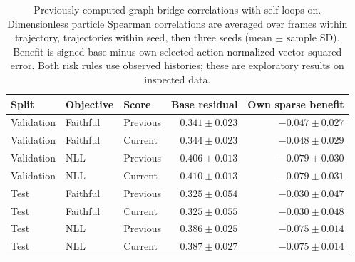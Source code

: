 \begin{table}[ht]
\centering\small
\caption{Previously computed graph-bridge correlations with self-loops on. Dimensionless particle Spearman correlations are averaged over frames within trajectory, trajectories within seed, then three seeds (mean $\pm$ sample SD). Benefit is signed base-minus-own-selected-action normalized vector squared error. Both risk rules use observed histories; these are exploratory results on inspected data.}
\label{tab:graph-bridge-risk-benefit}
\begin{tabular}{lllrr}
\toprule
Split & Objective & Score & Base residual & Own sparse benefit\\
\midrule
Validation&Faithful&Previous&$0.341\pm0.023$&$-0.047\pm0.027$\\
Validation&Faithful&Current&$0.344\pm0.023$&$-0.048\pm0.029$\\
Validation&NLL&Previous&$0.406\pm0.013$&$-0.079\pm0.030$\\
Validation&NLL&Current&$0.410\pm0.013$&$-0.079\pm0.031$\\
Test&Faithful&Previous&$0.325\pm0.054$&$-0.030\pm0.047$\\
Test&Faithful&Current&$0.325\pm0.055$&$-0.030\pm0.048$\\
Test&NLL&Previous&$0.386\pm0.025$&$-0.075\pm0.014$\\
Test&NLL&Current&$0.387\pm0.027$&$-0.075\pm0.014$\\
\bottomrule
\end{tabular}
\end{table}